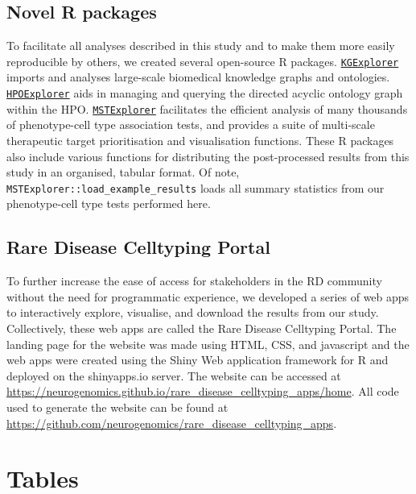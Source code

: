 \documentclass[
]{report}
\begin{document}
\subsection{Novel R packages}\label{novel-r-packages}

To facilitate all analyses described in this study and to make them more
easily reproducible by others, we created several open-source R
packages.
\href{https://github.com/neurogenomics/KGExplorer}{\texttt{KGExplorer}}
imports and analyses large-scale biomedical knowledge graphs and
ontologies.
\href{https://github.com/neurogenomics/HPOExplorer}{\texttt{HPOExplorer}}
aids in managing and querying the directed acyclic ontology graph within
the HPO.
\href{https://github.com/neurogenomics/MSTExplorer}{\texttt{MSTExplorer}}
facilitates the efficient analysis of many thousands of phenotype-cell
type association tests, and provides a suite of multi-scale therapeutic
target prioritisation and visualisation functions. These R packages also
include various functions for distributing the post-processed results
from this study in an organised, tabular format. Of note,
\texttt{MSTExplorer::load\_example\_results} loads all summary
statistics from our phenotype-cell type tests performed here.

\subsection{Rare Disease Celltyping
Portal}\label{rare-disease-celltyping-portal}

To further increase the ease of access for stakeholders in the RD
community without the need for programmatic experience, we developed a
series of web apps to interactively explore, visualise, and download the
results from our study. Collectively, these web apps are called the Rare
Disease Celltyping Portal. The landing page for the website was made
using HTML, CSS, and javascript and the web apps were created using the
Shiny Web application framework for R and deployed on the shinyapps.io
server. The website can be accessed at
\url{https://neurogenomics.github.io/rare_disease_celltyping_apps/home}.
All code used to generate the website can be found at
\url{https://github.com/neurogenomics/rare_disease_celltyping_apps}.

\newpage{}

\section{Tables}\label{tables}
\end{document}
